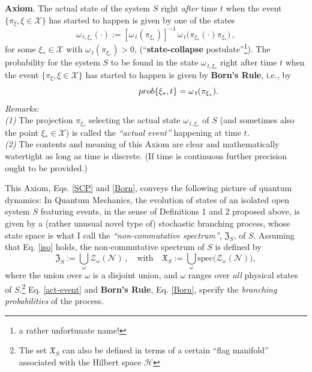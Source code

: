 \documentclass[12pt]{article}
\begin{document}
\begin{enumerate}
{{\bf{Axiom}}. The actual state of the system $S$ right \textit{after} time $t$ when the event $\lbrace \pi_{\xi}, \xi \in \mathcal{X} \rbrace$ has started to happen is given by one of the states
\begin{equation}\label{SCP}
\omega_{\,t, \xi_{*}}(\cdot):=[\omega_{\,t}(\pi_{\xi_{*}})]^{-1}\,\omega_{\,t}\big(\pi_{\xi_{*}} (\cdot) \pi_{\xi_{*}}\big)\,,
\end{equation}
for some $\xi_{*} \in \mathcal{X}$ with $\omega_{\,t}(\pi_{\xi_{*}})>0$, (``{\bf{state-collapse}} postulate''\footnote{a rather unfortunate name!}). The probability for the system $S$ to be found in the state $\omega_{\,t,\xi_{*}}$ right after time $t$ when the event 
$\lbrace \pi_{\xi}, \xi \in \mathcal{X} \rbrace$ has started to happen is given by {\bf{Born's Rule}}, i.e., by
\begin{equation}\label{Born}
\hspace{4.1cm}prob\{\xi_{*}, t\} = \omega_{\,t}(\pi_{\xi_{*}}). \hspace{2.2cm} \square
\end{equation}
\textit{Remarks:} \\
\textit{(1)} The projection $\pi_{\xi_{*}}$ selecting the actual state $\omega_{\,t, \xi_{*}}$ of $S$ (and sometimes also the point 
$\xi_{*} \in \mathcal{X}$) is called the \textit{``actual event''} happening at time $t$. \\
\textit{(2)} The contents and meaning of this Axiom are clear and mathematically watertight as long as time is discrete. (If time is continuous further precision ought to be provided.)}
\end{enumerate}
This Axiom, Eqs. \eqref{SCP} and \eqref{Born}, conveys the following picture of quantum dynamics: In Quantum Mechanics, the {evolution of states} of an isolated open system $S$ featuring events, in the sense of Definitions 1 and 2 proposed above, is given by a (rather unusual novel type of) {stochastic branching process}, whose state space is what I call the \textit{``non-commutative spectrum''}, 
$\mathfrak{Z}_{S}$, of $S$. Assuming that Eq. \eqref{iso} holds, the non-commutative spectrum of $S$ is defined by
\begin{equation}\label{NCspect}
\mathfrak{Z}_{S}:= \bigcup_{\omega} \mathcal{Z}_{\omega}(\mathcal{N})\,, \quad \text{with} \quad \mathfrak{X}_{S}:= \bigcup_{\omega} \text{spec}\Big(\mathcal{Z}_{\omega}(\mathcal{N})\Big),
\end{equation}
where the union over $\omega$ is a disjoint union, and $\omega$ ranges over \textit{all} physical states of $S$.\footnote{The set $\mathfrak{X}_{S}$ can also be defined in terms of a certain ``flag manifold'' associated with the Hilbert space $\mathcal{H}$} Eq. \eqref{act-event} and {\bf{Born's Rule}}, Eq. \eqref{Born}, specify the \textit{branching probabilities} of the process.\\
\end{document}
